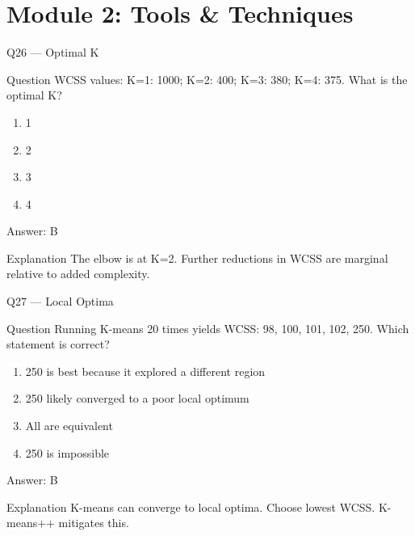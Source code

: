 \documentclass[aspectratio=169,8pt]{beamer}
\begin{document}
	\section{Module 2: Tools \& Techniques}
	
	\begin{frame}{Q26 --- Optimal K}
		\begin{block}{Question}
			WCSS values: K=1: 1000; K=2: 400; K=3: 380; K=4: 375. What is the optimal K?
		\end{block}
		\begin{enumerate}
			\item 1
			\item 2
			\item 3
			\item 4
		\end{enumerate}
		\begin{exampleblock}{Answer: B}\end{exampleblock}
		\begin{block}{Explanation}
			The elbow is at K=2. Further reductions in WCSS are marginal relative to added complexity.
		\end{block}
	\end{frame}
	
	\begin{frame}{Q27 --- Local Optima}
		\begin{block}{Question}
			Running K-means 20 times yields WCSS: 98, 100, 101, 102, 250. Which statement is correct?
		\end{block}
		\begin{enumerate}
			\item 250 is best because it explored a different region
			\item 250 likely converged to a poor local optimum
			\item All are equivalent
			\item 250 is impossible
		\end{enumerate}
		\begin{exampleblock}{Answer: B}\end{exampleblock}
		\begin{block}{Explanation}
			K-means can converge to local optima. Choose lowest WCSS. K-means++ mitigates this.
		\end{block}
	\end{frame}
	
\end{document}

